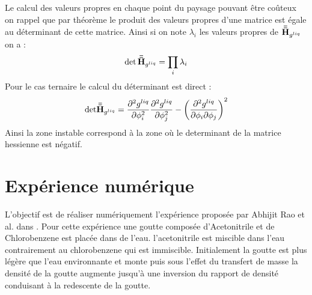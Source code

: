 Le calcul des valeurs propres en chaque point du paysage pouvant être coûteux on rappel que par théorème le produit des valeurs propres d'une matrice est égale au déterminant de cette matrice. Ainsi si on note $\lambda_i$ les valeurs propres de $\mathbf{\bar{\bar{H}}}_{g^{liq}}$ on a :
\begin{equation}
	\det{\mathbf{\bar{\bar{H}}}_{g^{liq}}} = \prod_i \lambda_i
\end{equation}
Pour le cas ternaire le calcul du déterminant est direct :
\begin{equation}
	\text{det}  \mathbf{\bar{\bar{H}}}_{g^{liq}}   =  \frac{\partial^2 g^{liq}}{\partial \phi_i^2}
	\frac{\partial^2 g^{liq}}{\partial \phi_j^2}-\left(\frac{\partial^2 g^{liq} }{\partial \phi_i \partial \phi_j} \right)^2
\end{equation}
Ainsi la zone instable correspond à la zone où le determinant de la matrice hessienne est négatif.


\section{Expérience numérique}

L'objectif est de réaliser numériquement l'expérience proposée par Abhijit Rao et al. dans \cite{rao_influence_2015}. Pour cette expérience une goutte composée d'Acetonitrile et de Chlorobenzene est placée dans de l'eau. l'acetonitrile est miscible dans l'eau contrairement au chlorobenzene qui est immiscible. Initialement la goutte est plus légère que l'eau environnante et monte puis sous l'effet du transfert de masse la densité de la goutte augmente jusqu’à une inversion du rapport de densité conduisant à la redescente de la goutte.
